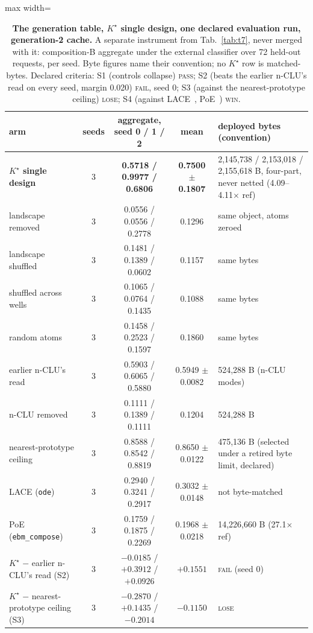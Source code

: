 \documentclass{article} %
\newcommand{\Kstar}{\ensuremath{K^{\star}}}
\begin{document}
\begin{table}[h]
\centering\scriptsize
\caption{\textbf{The generation table, $\Kstar$ single design, one declared evaluation run, %
generation-2 cache.} A separate instrument from Tab.~\ref{tab:t7}, never merged with it:
composition-B aggregate under the external classifier over 72 held-out requests, per seed. %
Byte figures name their convention; no $\Kstar$ row is matched-bytes. Declared criteria: S1
(controls collapse) \textsc{pass}; S2 (beats the earlier n-CLU's read on every seed, margin 0.020) \textsc{fail}, seed 0; %
S3 (against the nearest-prototype ceiling) \textsc{lose}; S4 (against LACE~\citep{nie_controllable_2021}, PoE~\citep{hinton_training_2002}) \textsc{win}.}
\label{tab:gentable-kstar}
\setlength{\tabcolsep}{2.4pt}
\begin{adjustbox}{max width=\linewidth}\begin{tabular}{lcccp{4.2cm}}
\toprule
arm & seeds & aggregate, seed 0 / 1 / 2 & mean & deployed bytes (convention) \\
\midrule
\textbf{$\Kstar$ single design} & 3 & \textbf{0.5718 / 0.9977 / 0.6806} & \textbf{0.7500 $\pm$ 0.1807} & 2,145,738 / 2,153,018 / 2,155,618 B, four-part, never netted (4.09--4.11$\times$ ref) \\
\quad landscape removed & 3 & 0.0556 / 0.0556 / 0.2778 & 0.1296 & same object, atoms zeroed \\
\quad landscape shuffled & 3 & 0.1481 / 0.1389 / 0.0602 & 0.1157 & same bytes \\
\quad shuffled across wells & 3 & 0.1065 / 0.0764 / 0.1435 & 0.1088 & same bytes \\
\quad random atoms & 3 & 0.1458 / 0.2523 / 0.1597 & 0.1860 & same bytes \\
earlier n-CLU's read & 3 & 0.5903 / 0.6065 / 0.5880 & 0.5949 $\pm$ 0.0082 & 524,288 B (n-CLU modes) \\
n-CLU removed & 3 & 0.1111 / 0.1389 / 0.1111 & 0.1204 & 524,288 B \\
nearest-prototype ceiling & 3 & 0.8588 / 0.8542 / 0.8819 & 0.8650 $\pm$ 0.0122 & 475,136 B (selected under a retired byte limit, declared) \\
LACE (\texttt{ode}) & 3 & 0.2940 / 0.3241 / 0.2917 & 0.3032 $\pm$ 0.0148 & not byte-matched \\
PoE (\texttt{ebm\_compose}) & 3 & 0.1759 / 0.1875 / 0.2269 & 0.1968 $\pm$ 0.0218 & 14,226,660 B (27.1$\times$ ref) \\
\midrule
$\Kstar$ $-$ earlier n-CLU's read (S2) & 3 & $-0.0185$ / $+0.3912$ / $+0.0926$ & $+0.1551$ & \textsc{fail} (seed 0) \\
$\Kstar$ $-$ nearest-prototype ceiling (S3) & 3 & $-0.2870$ / $+0.1435$ / $-0.2014$ & $-0.1150$ & \textsc{lose} \\
\bottomrule
\end{tabular}\end{adjustbox}
\end{table}
\end{document}
